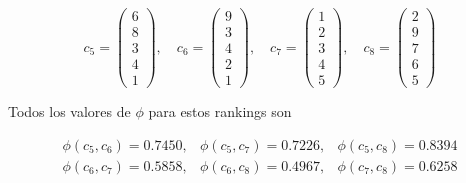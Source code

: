 \begin{ejemplo}
\begin{equation*}
c_5 = \left( \begin{array}{c}
6\\
8\\
3\\
4\\
1
\end{array} \right), \quad
c_6 = \left( \begin{array}{c}
9\\
3\\
4\\
2\\
1
\end{array} \right), \quad
c_7 = \left( \begin{array}{c}
1\\
2\\
3\\
4\\
5
\end{array} \right), \quad
c_8 = \left( \begin{array}{c}
2\\
9\\
7\\
6\\
5
\end{array} \right)
\end{equation*}

Todos los valores de $\phi$ para estos rankings son

\begin{equation*}
\begin{array}{ccc}
\phi(c_5, c_6) = 0.7450, & \phi(c_5, c_7) = 0.7226, & \phi(c_5, c_8) = 0.8394\\
\phi(c_6, c_7) = 0.5858, & \phi(c_6, c_8) = 0.4967, & \phi(c_7, c_8) = 0.6258 
\end{array}
\end{equation*}

\end{ejemplo}
